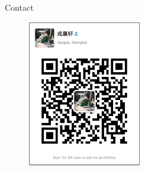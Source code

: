 \documentclass{beamer}
\begin{document}
    \begin{frame}{Contact}
        \begin{figure}
        \centering
        \includegraphics[width=5cm]{wechat}
        \end{figure}
    \end{frame}
 
\end{document}

